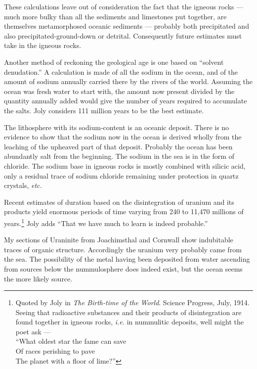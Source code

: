 \documentclass[a4paper, 12pt, oneside]{article}
\begin{document}
These calculations leave out of consideration the fact that the igneous rocks --- much more bulky than all the sediments and limestones put together, are themselves metamorphosed oceanic sediments --- probably both precipitated and also precipitated-ground-down or detrital. Consequently future estimates must take in the igneous rocks.

Another method of reckoning the geological age is one based on ``solvent denudation.'' A calculation is made of all the sodium in the ocean, and of the amount of sodium annually carried there by the rivers of the world. Assuming the ocean was fresh water to start with, the amount now present divided by the quantity annually added would give the number of years required to accumulate the salts. Joly considers 111 million years to be the best estimate.

The lithosphere with its sodium-content is an oceanic deposit. There is no evidence to show that the sodium now in the ocean is derived wholly from the leaching of the upheaved part of that deposit. Probably the ocean has been abundantly salt from the beginning. The sodium in the sea is in the form of chloride. The sodium base in igneous rocks is mostly combined with silicic acid, only a residual trace of sodium chloride remaining under protection in quartz crystals, \emph{etc.}

Recent estimates of duration based on the disintegration of uranium and its products yield enormous periods of time varying from 240 to 11,470 millions of years.\footnote{Quoted by Joly in \emph{The Birth-time of the World}. Science Progress, July, 1914. Seeing that radioactive substances and their products of disintegration are found together in igneous rocks, \emph{i.e.} in nummulitic deposits, well might the poet ask --- \\``What oldest star the fame can save\\Of races perishing to pave\\The planet with a floor of lime?''} Joly adds ``That we have much to learn is indeed probable.''

My sections of Uraninite from Joachimsthal and Cornwall show indubitable traces of organic structure. Accordingly the uranium very probably came from the sea. The possibility of the metal having been deposited from water ascending from sources below the nummulosphere does indeed exist, but the ocean seems the more likely source.
\end{document}
